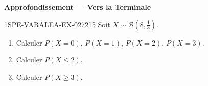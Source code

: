 \begin{center}\textbf{Approfondissement — Vers la Terminale}\end{center}
\begin{exercice}{1SPE-VARALEA-EX-027}{2}{15}
Soit $X \sim \mathcal{B}(8, \frac{1}{3})$.

\begin{enumerate}
  \item Calculer $P(X = 0)$, $P(X = 1)$, $P(X = 2)$, $P(X = 3)$.
  \item Calculer $P(X \leq 2)$.
  \item Calculer $P(X \geq 3)$.
\end{enumerate}
\end{exercice}
